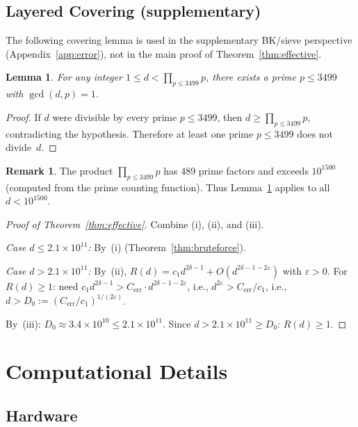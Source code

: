 \documentclass[11pt,a4paper]{amsart}
\newtheorem{lemma}[theorem]{Lemma}
\theoremstyle{definition}
\newtheorem{remark}[theorem]{Remark}
\begin{document}
\subsection{Layered Covering (supplementary)}
The following covering lemma is used in the supplementary BK/sieve perspective (Appendix~\ref{app:error}), not in the main proof of Theorem~\ref{thm:effective}.

\begin{lemma}\label{lem:covering}
For any integer $1 \leq d < \prod_{p \leq 3499} p$, there exists a prime $p \leq 3499$ with $\gcd(d,p) = 1$.
\end{lemma}

\begin{proof}
If $d$ were divisible by every prime $p \leq 3499$, then $d \geq \prod_{p \leq 3499} p$, contradicting the hypothesis. Therefore at least one prime $p \leq 3499$ does not divide~$d$.
\end{proof}

\begin{remark}
The product $\prod_{p \leq 3499} p$ has 489 prime factors and exceeds $10^{1500}$ (computed from the prime counting function). Thus Lemma~\ref{lem:covering} applies to all $d < 10^{1500}$.
\end{remark}

\begin{proof}[Proof of Theorem~\ref{thm:effective}]
Combine (i), (ii), and (iii).

\emph{Case $d \leq 2.1 \times 10^{11}$:} By~(i) (Theorem~\ref{thm:bruteforce}).

\emph{Case $d > 2.1 \times 10^{11}$:} By~(ii), $R(d) = c_1 d^{2\delta-1} + O(d^{2\delta-1-2\varepsilon})$ with $\varepsilon > 0$. For $R(d) \geq 1$: need $c_1 d^{2\delta-1} > C_{\text{err}} \cdot d^{2\delta-1-2\varepsilon}$, i.e., $d^{2\varepsilon} > C_{\text{err}}/c_1$, i.e., $d > D_0 := (C_{\text{err}}/c_1)^{1/(2\varepsilon)}$.

By~(iii): $D_0 \approx 3.4 \times 10^{10} \leq 2.1 \times 10^{11}$. Since $d > 2.1 \times 10^{11} \geq D_0$: $R(d) \geq 1$.
\end{proof}

\section{Computational Details}

\subsection{Hardware}
\end{document}
